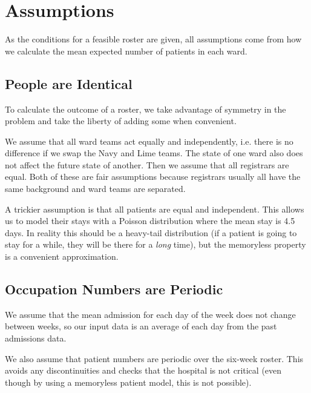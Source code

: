 \documentclass[a4paper]{article}
\begin{document}
\section{Assumptions}

As the conditions for a feasible roster are given, all assumptions come from how we calculate the mean expected number of patients in each ward.

\subsection{People are Identical}

To calculate the outcome of a roster, we take advantage of symmetry in the problem and take the liberty of adding some when convenient.

We assume that all ward teams act equally and independently, i.e. there is no difference if we swap the Navy and Lime teams. The state of one ward also does not affect the future state of another. Then we assume that all registrars are equal. Both of these are fair assumptions because registrars usually all have the same background and ward teams are separated.

A trickier assumption is that all patients are equal and independent. This allows us to model their stays with a Poisson distribution where the mean stay is 4.5 days. In reality this should be a heavy-tail distribution (if a patient is going to stay for a while, they will be there for a \emph{long} time), but the memoryless property is a convenient approximation.

\subsection{Occupation Numbers are Periodic}

We assume that the mean admission for each day of the week does not change between weeks, so our input data is an average of each day from the past admissions data.

We also assume that patient numbers are periodic over the six-week roster. This avoids any discontinuities and checks that the hospital is not critical (even though by using a memoryless patient model, this is not possible).
\end{document}
